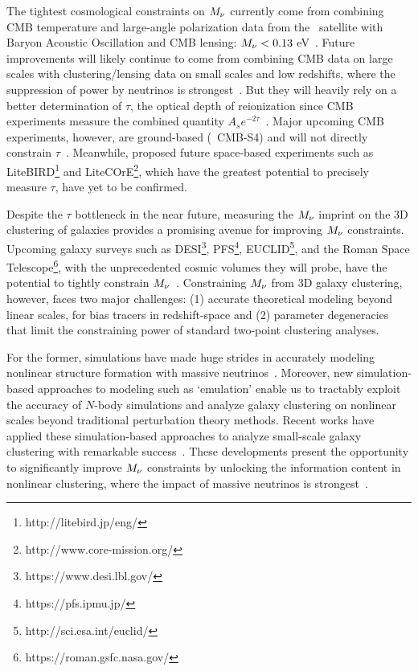 The tightest cosmological constraints on $M_\nu$ currently come from 
combining CMB temperature and large-angle polarization data from the 
\planck~satellite with Baryon Acoustic Oscillation and CMB lensing: 
$M_\nu < 0.13$ eV~\citep{planckcollaboration2018}. Future improvements
will likely continue to come from combining CMB data on large scales 
with clustering/lensing data on small scales and low redshifts, where 
the suppression of power by neutrinos is strongest~\citep{brinckmann2019}. 
But they will heavily rely on a better determination of $\tau$, the optical
depth of reionization since CMB experiments measure the combined quantity $A_s
e^{-2\tau}$~\citep{allison2015, liu2016, archidiacono2017}.
Major upcoming CMB experiments, however, are ground-based (\eg~CMB-S4) and 
will not directly constrain $\tau$~\citep{abazajian2016}. Meanwhile, proposed
future space-based experiments such as
LiteBIRD\footnote{http://litebird.jp/eng/} and 
LiteCOrE\footnote{http://www.core-mission.org/}, which have the greatest 
potential to precisely measure $\tau$, have yet to be confirmed. 

Despite the $\tau$ bottleneck in the near future, measuring the $M_\nu$ imprint 
on the 3D clustering of galaxies provides a promising avenue for improving $M_\nu$ constraints. 
Upcoming galaxy surveys such as DESI\footnote{https://www.desi.lbl.gov/}, 
PFS\footnote{https://pfs.ipmu.jp/}, EUCLID\footnote{http://sci.esa.int/euclid/}, 
and the Roman Space Telescope\footnote{https://roman.gsfc.nasa.gov/}, 
with the unprecedented cosmic volumes they will probe, 
have the potential to tightly constrain 
$M_\nu$~\citep{audren2013, font-ribera2014, petracca2016, sartoris2016, boyle2018}.
Constraining $M_\nu$ from 3D galaxy clustering, however, faces two major 
challenges: (1) accurate theoretical modeling beyond linear scales, for bias
tracers in redshift-space and (2) parameter degeneracies that limit the
constraining power of standard two-point clustering analyses. 

For the former, simulations have made huge strides in accurately modeling 
nonlinear structure formation with massive neutrinos~\citep[\eg][]{brandbyge2008, 
villaescusa-navarro2013, castorina2015, adamek2017, emberson2017, banerjee2018, 
villaescusa-navarro2018a, villaescusa-navarro2019, yoshikawa2020}. Moreover, new simulation-based
approaches to modeling such as `emulation' enable us to tractably exploit the accuracy of 
$N$-body simulations and analyze galaxy clustering on nonlinear scales beyond
traditional perturbation theory methods. Recent works have applied
these simulation-based approaches to analyze small-scale galaxy clustering with
remarkable success~\citep[\eg][]{heitmann2009a, kwan2015, euclidcollaboration2018, lange2019, zhai2019, wibking2019}. 
These developments present the opportunity to significantly improve $M_\nu$
constraints by unlocking the information content in nonlinear clustering, where
the impact of massive neutrinos is strongest~\citep[\eg][]{brandbyge2008,
saito2008, wong2008, saito2009, viel2010a, agarwal2011, marulli2011, bird2012,
castorina2015, banerjee2016, upadhye2016, banerjee2020, allys2020, massara2020,
uhlemann2020}.

